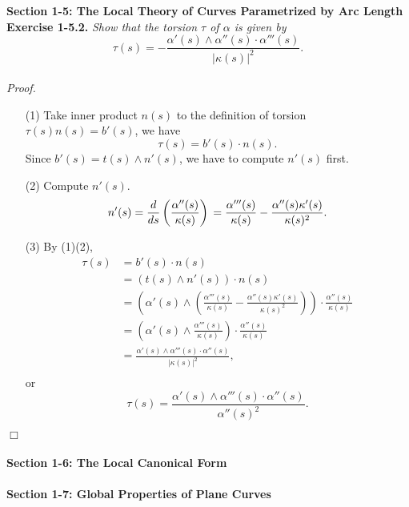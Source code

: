 \documentclass{article}
\begin{document}



\textbf{\large Section 1-5: The Local Theory of Curves Parametrized by Arc Length} \\

\textbf{Exercise 1-5.2.}
\emph{Show that the torsion $\tau$ of $\alpha$ is given by
$$\tau(s) = -\frac{\alpha'(s) \wedge \alpha''(s) \cdot \alpha'''(s)}{|\kappa(s)|^2}.$$} \\

\emph{Proof.}
\begin{enumerate}
\item[(1)]
Take inner product $n(s)$
to the definition of torsion $\tau(s) n(s) = b'(s)$,
we have $$\tau(s) = b'(s) \cdot n(s).$$
Since $b'(s) = t(s) \wedge n'(s)$, we have to compute $n'(s)$ first.
\item[(2)]
Compute $n'(s)$.
$$n'(s)
= \frac{d}{ds} \left( \frac{\alpha''(s)}{\kappa(s)} \right) \\
= \frac{\alpha'''(s)}{\kappa(s)} - \frac{\alpha''(s)\kappa'(s)}{\kappa(s)^2}.$$
\item[(3)]
By (1)(2),
\begin{align*}
\tau(s)
&= b'(s) \cdot n(s) \\
&= (t(s) \wedge n'(s)) \cdot n(s) \\
&= \left(
  \alpha'(s)
    \wedge
  \left(
    \frac{\alpha'''(s)}{\kappa(s)}
    - \frac{\alpha''(s)\kappa'(s)}{\kappa(s)^2}
  \right)
\right)
\cdot \frac{\alpha''(s)}{\kappa(s)} \\
&= \left(
  \alpha'(s) \wedge \frac{\alpha'''(s)}{\kappa(s)}
\right)
\cdot \frac{\alpha''(s)}{\kappa(s)} \\
&= \frac{\alpha'(s) \wedge \alpha'''(s) \cdot \alpha''(s)}{|\kappa(s)|^2}, \\
\end{align*}
or
$$\tau(s) = \frac{\alpha'(s) \wedge \alpha'''(s) \cdot \alpha''(s)}{\alpha''(s)^2}.$$

\end{enumerate}
$\Box$ \\\\






\textbf{\large Section 1-6: The Local Canonical Form} \\\\






\textbf{\large Section 1-7: Global Properties of Plane Curves} \\\\



\end{document}
